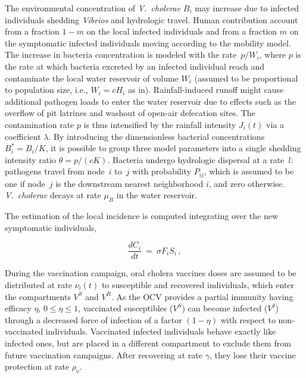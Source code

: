 The environmental concentration of \textit{V.~cholerae} $B_i$ may increase due to  infected individuals shedding \textit{Vibrios} and hydrologic travel. Human contribution account from a fraction $1-m$ on the local infected individuals and from a fraction $m$ on the symptomatic infected individuals moving according to the mobility model. The increase in bacteria concentration is modeled with the rate~$p/W_i$, where $p$ is the rate at which bacteria excreted by an infected individual reach and contaminate the local water reservoir of volume $W_i$ (assumed to be proportional to population size, i.e., $W_i=c H_i$ as in\textcite{Rinaldo:Reassessment20102011:2012}). Rainfall-induced runoff might cause additional pathogen loads to enter the water reservoir due to effects such as the overflow of pit latrines and washout of open-air defecation sites. The contamination rate $p$ is thus intensified by the rainfall intensity $J_i(t)$ via a coefficient $\lambda$\cite{Rinaldo:Reassessment20102011:2012,Righetto:RainfallMediationsSpreading:2013}. By introducing the dimensionless bacterial concentrations $B_i^*=B_i/K$,  it is possible to group three model parameters into a single shedding intensity ratio $\theta=p/(cK)$\cite{Bertuzzo:SpacetimeEvolutionCholera:2008}. Bacteria undergo hydrologic dispersal at a rate~$l$: pathogens travel from node~$i$ to~$j$ with probability $P_{ij}$, which is assumed to be one if node~$j$ is the downstream nearest neighborhood $i$, and zero otherwise. \textit{V.~cholerae} decays at rate $\mu_B$ in the water reservoir.

The estimation of the local incidence is computed integrating over the new symptomatic individuals,

\begin{equation}
\frac{d C_i}{dt} \ = \ \sigma F_i S_i  \, , \label{eq:C}
\end{equation}

During the vaccination campaign, oral cholera vaccines doses are assumed to be distributed at rate $\nu_i(t)$ to susceptible and recovered individuals, which enter the compartments $V^S$ and $V^R$. As the OCV provides a partial immunity having efficacy $\eta$, $0\leq \eta \leq 1$, vaccinated susceptibles ($V^S$) can become infected ($V^I$) through a decreased force of infection of a factor $(1-\eta)$ with respect to non-vaccinated individuals. Vaccinated infected individuals behave exactly like infected ones, but are placed in a different compartment to exclude them from future vaccination campaigns. After recovering at  rate $\gamma$, they lose their vaccine protection at rate $\rho_{v}$.


